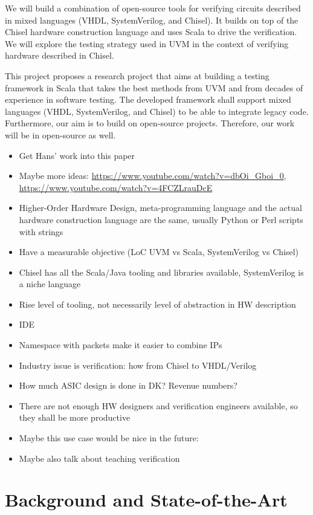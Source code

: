 \documentclass[conference]{IEEEtran}
\begin{document}
We will build a combination of open-source tools for verifying
circuits described in mixed languages (VHDL, SystemVerilog, and Chisel).
It builds on top of the Chisel hardware construction language and uses Scala to drive the verification. 
We will explore the testing strategy used in UVM in the context of verifying hardware described in Chisel.

This project proposes a research project that aims at building a testing framework
in Scala that takes the best methods from UVM and from decades of experience
in software testing.
The developed framework shall support mixed languages (VHDL, SystemVerilog, and Chisel)
to be able to integrate legacy code.
Furthermore, our aim is to build on open-source projects. Therefore, our
work will be in open-source as well.

\begin{itemize}
\item Get Hans' work into this paper
\item Maybe more ideas: \url{https://www.youtube.com/watch?v=dbOi_Gboi_0}, \url{https://www.youtube.com/watch?v=4FCZLrauDcE}
\item Higher-Order Hardware Design, meta-programming language and the actual hardware construction language are the same, usually Python or Perl scripts with strings
\item Have a measurable objective (LoC UVM vs Scala, SystemVerilog vs Chisel)
\item Chisel has all the Scala/Java tooling and libraries available, SystemVerilog is a niche language
\item Rise level of tooling, not necessarily level of abstraction in HW description
\item IDE
\item Namespace with packets make it easier to combine IPs
\item Industry issue is verification: how from Chisel to VHDL/Verilog
\item How much ASIC design is done in DK? Revenue numbers?
\item There are not enough HW designers and verification engineers available, so they shall be more productive
\item Maybe this use case would be nice in the future:~\cite{s4noc:nocarc2019}
\item Maybe also talk about teaching verification
\end{itemize}

\section{Background and State-of-the-Art}
\label{sec:background}
\end{document}
